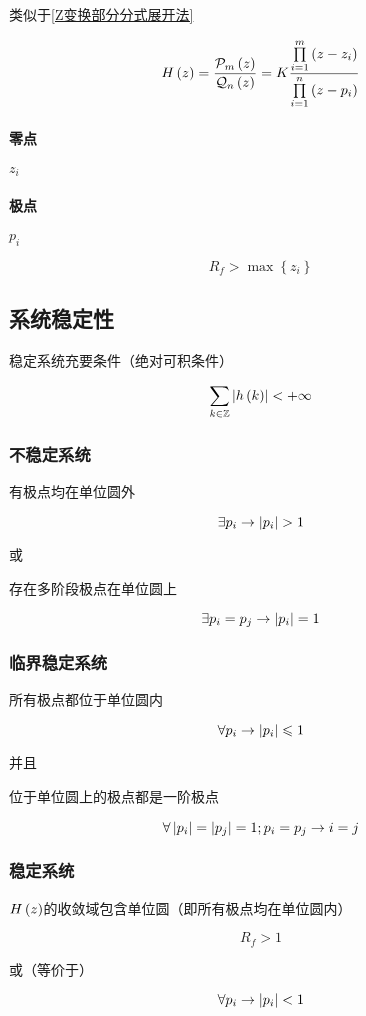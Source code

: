\documentclass{article}
\begin{document}
类似于\ref{Z变换部分分式展开法}

\[H\left(z\right)=\frac{\mathcal P_m\left(z\right)}{\mathcal Q_n\left(z\right)}
    =K\frac{\prod\limits_{i=1}^m\left(z-z_i\right)}
    {\prod\limits_{i=1}^n\left(z-p_i\right)}\]

\paragraph{零点}$z_i$

\paragraph{极点}$p_i$

\[R_f>\max\left\{z_i\right\}\]

\subsection{系统稳定性}

稳定系统充要条件（绝对可积条件）

\[\sum_{k\in\mathbb Z}\left|h\left(k\right)\right|<+\infty\]

\subsubsection{不稳定系统}

有极点均在单位圆外

\[\exists p_i\to\abs{p_i}>1\]

或

存在多阶段极点在单位圆上

\[\exists p_i=p_j\to\left|p_i\right|=1\]

\subsubsection{临界稳定系统}

所有极点都位于单位圆内

\[\forall p_i\to\left|p_i\right|\leqslant1\]

并且

位于单位圆上的极点都是一阶极点

\[\forall\left|p_i\right|=\left|p_j\right|=1;p_i=p_j\to i=j\]

\subsubsection{稳定系统}

$H\left(z\right)$的收敛域包含单位圆（即所有极点均在单位圆内）

\[R_f>1\]

或（等价于）

\[\forall p_i\to\left|p_i\right|<1\]
\end{document}
